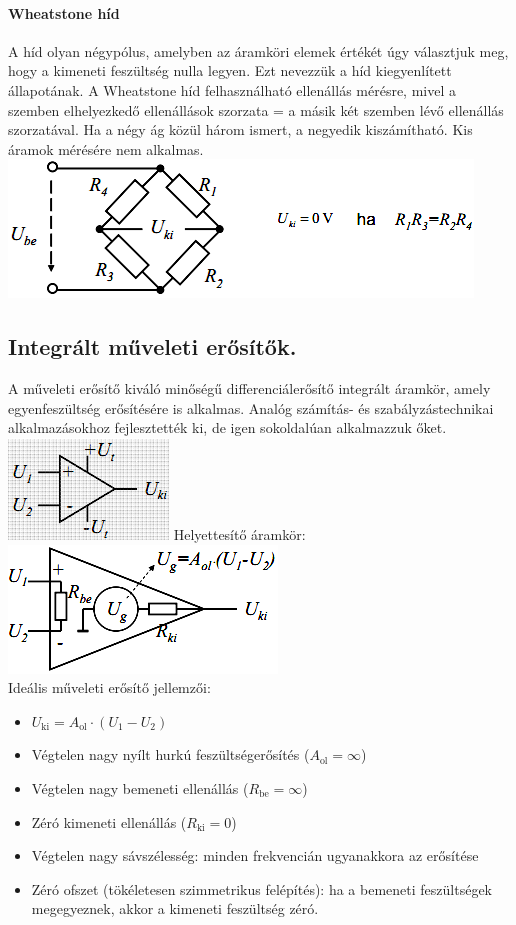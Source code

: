 \paragraph{Wheatstone híd} A híd olyan négypólus, amelyben az áramköri elemek értékét úgy választjuk meg, hogy a kimeneti feszültség nulla legyen. Ezt nevezzük a híd kiegyenlített állapotának. A Wheatstone híd felhasználható ellenállás mérésre, mivel a szemben elhelyezkedő ellenállások szorzata = a másik két szemben lévő ellenállás szorzatával. Ha a négy ág közül három ismert, a negyedik kiszámítható. Kis áramok mérésére nem alkalmas.\\
\includegraphics[width=0.5\linewidth]{fig/10-wheatstone_bridge}

\subsection{Integrált műveleti erősítők.}
A műveleti erősítő kiváló minőségű differenciálerősítő integrált áramkör, amely egyenfeszültség erősítésére is alkalmas. Analóg számítás- és szabályzástechnikai alkalmazásokhoz fejlesztették ki, de igen sokoldalúan alkalmazzuk őket.\\
\includegraphics[width=0.25\linewidth]{fig/10-op_amp}\quad
Helyettesítő áramkör: \includegraphics[width=0.5\linewidth]{fig/10-op_amp1}\\

Ideális műveleti erősítő jellemzői:
\begin{itemize}
	\item $U_\text{ki} =A_\text{ol} \cdot (U_1 - U_2)$
	\item Végtelen nagy nyílt hurkú feszültségerősítés ($A_\text{ol} = \infty$)
	\item Végtelen nagy bemeneti ellenállás ($R_\text{be} = \infty$)
	\item Zéró kimeneti ellenállás ($R_\text{ki} = 0$)
	\item Végtelen nagy sávszélesség: minden frekvencián ugyanakkora az erősítése
	\item Zéró ofszet (tökéletesen szimmetrikus felépítés): ha a bemeneti feszültségek megegyeznek, akkor a kimeneti feszültség zéró.
\end{itemize}

